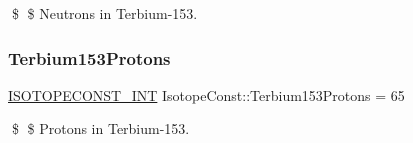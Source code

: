 \$ \$ Neutrons in Terbium-\/153. \mbox{\label{group___isotope_const-_terbium-_tb153_ga0b1a9e585677c825dec688f3c5bd6402}} 
\subsubsection{\texorpdfstring{Terbium153\+Protons}{Terbium153Protons}}
{\footnotesize\ttfamily \mbox{\hyperlink{group___isotope_const-_macros_ga5f18360b3e99483a35c32d789e62621c}{I\+S\+O\+T\+O\+P\+E\+C\+O\+N\+S\+T\+\_\+\+I\+NT}} Isotope\+Const\+::\+Terbium153\+Protons = 65}

\$ \$ Protons in Terbium-\/153. 